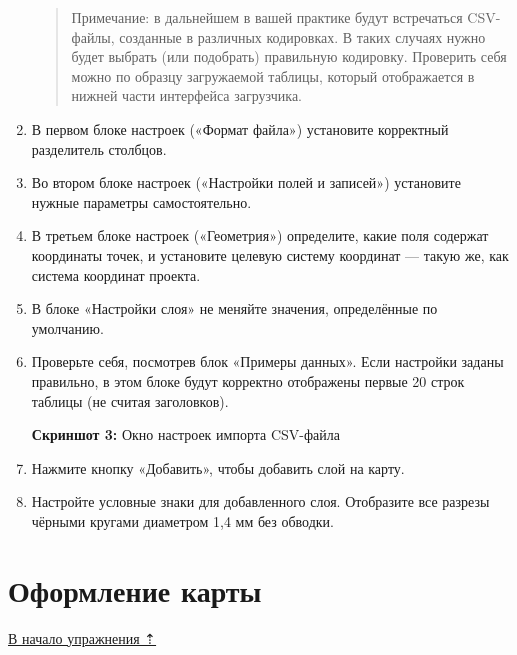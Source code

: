 \documentclass[
  12pt,
]{book}
\begin{document}
\begin{enumerate}
  \begin{quote}
  Примечание: в дальнейшем в вашей практике будут встречаться CSV-файлы, созданные в различных кодировках. В таких случаях нужно будет выбрать (или подобрать) правильную кодировку. Проверить себя можно по образцу загружаемой таблицы, который отображается в нижней части интерфейса загрузчика.
  \end{quote}
\item
  В первом блоке настроек («Формат файла») установите корректный разделитель столбцов.
\item
  Во втором блоке настроек («Настройки полей и записей») установите нужные параметры самостоятельно.
\item
  В третьем блоке настроек («Геометрия») определите, какие поля содержат координаты точек, и установите целевую систему координат --- такую же, как система координат проекта.
\item
  В блоке «Настройки слоя» не меняйте значения, определённые по умолчанию.
\item
  Проверьте себя, посмотрев блок «Примеры данных». Если настройки заданы правильно, в этом блоке будут корректно отображены первые 20 строк таблицы (не считая заголовков).

  \textbf{Скриншот 3:} Окно настроек импорта CSV-файла
\item
  Нажмите кнопку «Добавить», чтобы добавить слой на карту.
\item
  Настройте условные знаки для добавленного слоя. Отобразите все разрезы чёрными кругами диаметром 1,4 мм без обводки.
\end{enumerate}

\hypertarget{map-design-quaternary-final}{%
\section{Оформление карты}\label{map-design-quaternary-final}}

\protect\hyperlink{map-design-quaternary}{В начало упражнения ⇡}
\end{document}
